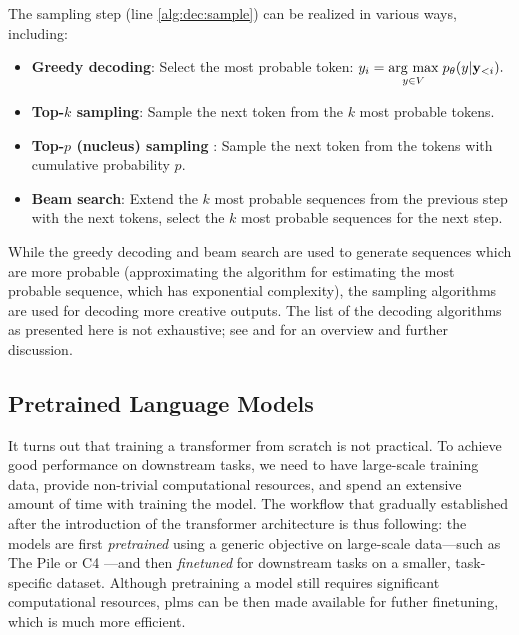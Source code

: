 {\noindent The sampling step (line \ref{alg:dec:sample}) can be realized in various ways, including:
\begin{itemize}
  \item \textbf{Greedy decoding}: Select the most probable token: $y_i = \underset{y \in V}{\operatorname{arg}\,\operatorname{max}}\; p_\theta(y|\mathbf{y}_{<i}).$
  \item \textbf{Top-$k$ sampling}: Sample the next token from the $k$ most probable tokens.
  \item \textbf{Top-$p$ (nucleus) sampling} \cite{holtzman2019curious}: Sample the next token from the tokens with cumulative probability $p$.
  \item \textbf{Beam search}: Extend the $k$ most probable sequences from the previous step with the next tokens, select the $k$ most probable sequences for the next step.
\end{itemize}
While the greedy decoding and beam search are used to generate sequences which are more probable (approximating the algorithm for estimating the most probable sequence, which has exponential complexity), the sampling algorithms are used for decoding more creative outputs. The list of the decoding algorithms as presented here is not exhaustive; see \citet{zarriess2021decoding} and \citet{wiher2022decoding} for an overview and further discussion.

\subsection{Pretrained Language Models}
\label{sec:plms}
It turns out that training a transformer from scratch is not practical. To achieve good performance on downstream tasks, we need to have large-scale training data, provide non-trivial computational resources, and spend an extensive amount of time with training the model. The workflow that gradually established after the introduction of the transformer architecture is thus following: the models are first \emph{pretrained} using a generic objective on large-scale data---such as The Pile \cite{gao2020pile} or C4 \cite{raffelExploringLimitsTransfer2019}---and then \emph{finetuned} for downstream tasks on a smaller, task-specific dataset. Although pretraining a model still requires significant computational resources, \acp{plm} can be then made available for futher finetuning, which is much more efficient.


}
